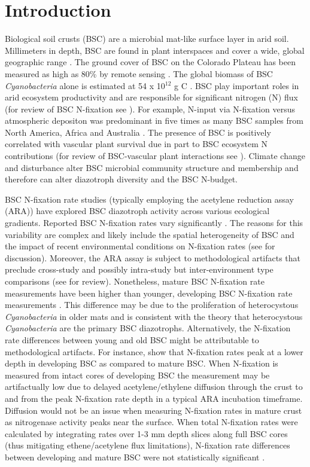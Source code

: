 \section{Introduction}
Biological soil crusts (BSC) are a microbial mat-like surface layer in arid
soil. Millimeters in depth, BSC are found in plant interspaces and cover a
wide, global geographic range \citep{garcia2003estimates}. The ground cover of
BSC on the Colorado Plateau has been measured as high as 80\% by remote sensing
\citep{karnieli2001}. The global biomass of BSC \textit{Cyanobacteria} alone is
estimated at 54 x 10$^{12}$ g C \citep{garcia2003estimates}. BSC play important
roles in arid ecosystem productivity and are responsible for significant
nitrogen (N) flux (for review of BSC N-fixation see \citet{belnap2003}). For
example, N-input via N-fixation versus atmospheric depositon was predominant in
five times as many BSC samples from North America, Africa and Australia
\citep{Evans_1999}.  The presence of BSC is positively correlated with vascular
plant survival due in part to BSC ecosystem N contributions (for review of
BSC-vascular plant interactions see \citet{BelnapVascular}). Climate change and
disturbance alter BSC microbial community structure and membership and therefore
can alter diazotroph diversity and the BSC N-budget.

BSC N-fixation rate studies (typically employing the acetylene reduction assay
(ARA)) have explored BSC diazotroph activity across various ecological
gradients. Reported BSC N-fixation rates vary significantly \citep{Evans_2001}.
The reasons for this variability are complex and likely include the spatial
heterogeneity of BSC \citep{Evans_2001} and the impact of recent environmental
conditions on N-fixation rates (see \citet{Belnap_2001} for discussion).
Moreover, the ARA assay is subject to methodological artifacts that preclude
cross-study and possibly intra-study but inter-environment type comparisons
(see \citet{Belnap_2001} for review). Nonetheless, mature BSC N-fixation rate
measurements have been higher than younger, developing BSC N-fixation rate
measurements \citep{Belnap_2002, 14766579}. This difference may be due to the
proliferation of heterocystous \textit{Cyanobacteria} in older mats and is
consistent with the theory that heterocystous \textit{Cyanobacteria} are the
primary BSC diazotrophs.  Alternatively, the N-fixation rate differences
between young and old BSC might be attributable to methodological artifacts.
For instance, \citet{15643930} show that N-fixation rates peak at a lower depth
in developing BSC as compared to mature BSC. When N-fixation is measured from
intact cores of developing BSC the measurement may be artifactually low due to
delayed acetylene/ethylene diffusion through the crust to and from the peak
N-fixation rate depth in a typical ARA incubation timeframe. Diffusion would
not be an issue when measuring N-fixation rates in mature crust as nitrogenase
activity peaks near the surface. When total N-fixation rates were calculated by
integrating rates over 1-3 mm depth slices along full BSC cores (thus
mitigating ethene/acetylene flux limitations), N-fixation rate differences
between developing and mature BSC were not statistically significant
\citep{15643930}.

